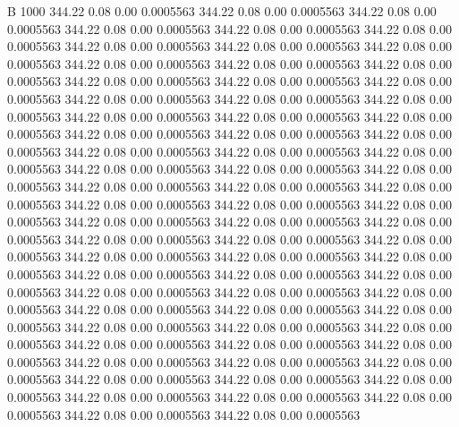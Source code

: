 


B 1000
 344.22    0.08    0.00   0.0005563
 344.22    0.08    0.00   0.0005563
 344.22    0.08    0.00   0.0005563
 344.22    0.08    0.00   0.0005563
 344.22    0.08    0.00   0.0005563
 344.22    0.08    0.00   0.0005563
 344.22    0.08    0.00   0.0005563
 344.22    0.08    0.00   0.0005563
 344.22    0.08    0.00   0.0005563
 344.22    0.08    0.00   0.0005563
 344.22    0.08    0.00   0.0005563
 344.22    0.08    0.00   0.0005563
 344.22    0.08    0.00   0.0005563
 344.22    0.08    0.00   0.0005563
 344.22    0.08    0.00   0.0005563
 344.22    0.08    0.00   0.0005563
 344.22    0.08    0.00   0.0005563
 344.22    0.08    0.00   0.0005563
 344.22    0.08    0.00   0.0005563
 344.22    0.08    0.00   0.0005563
 344.22    0.08    0.00   0.0005563
 344.22    0.08    0.00   0.0005563
 344.22    0.08    0.00   0.0005563
 344.22    0.08    0.00   0.0005563
 344.22    0.08    0.00   0.0005563
 344.22    0.08    0.00   0.0005563
 344.22    0.08    0.00   0.0005563
 344.22    0.08    0.00   0.0005563
 344.22    0.08    0.00   0.0005563
 344.22    0.08    0.00   0.0005563
 344.22    0.08    0.00   0.0005563
 344.22    0.08    0.00   0.0005563
 344.22    0.08    0.00   0.0005563
 344.22    0.08    0.00   0.0005563
 344.22    0.08    0.00   0.0005563
 344.22    0.08    0.00   0.0005563
 344.22    0.08    0.00   0.0005563
 344.22    0.08    0.00   0.0005563
 344.22    0.08    0.00   0.0005563
 344.22    0.08    0.00   0.0005563
 344.22    0.08    0.00   0.0005563
 344.22    0.08    0.00   0.0005563
 344.22    0.08    0.00   0.0005563
 344.22    0.08    0.00   0.0005563
 344.22    0.08    0.00   0.0005563
 344.22    0.08    0.00   0.0005563
 344.22    0.08    0.00   0.0005563
 344.22    0.08    0.00   0.0005563
 344.22    0.08    0.00   0.0005563
 344.22    0.08    0.00   0.0005563
 344.22    0.08    0.00   0.0005563
 344.22    0.08    0.00   0.0005563
 344.22    0.08    0.00   0.0005563
 344.22    0.08    0.00   0.0005563
 344.22    0.08    0.00   0.0005563
 344.22    0.08    0.00   0.0005563
 344.22    0.08    0.00   0.0005563
 344.22    0.08    0.00   0.0005563
 344.22    0.08    0.00   0.0005563
 344.22    0.08    0.00   0.0005563
 344.22    0.08    0.00   0.0005563
 344.22    0.08    0.00   0.0005563
 344.22    0.08    0.00   0.0005563
 344.22    0.08    0.00   0.0005563
 344.22    0.08    0.00   0.0005563
 344.22    0.08    0.00   0.0005563
 344.22    0.08    0.00   0.0005563
 344.22    0.08    0.00   0.0005563
 344.22    0.08    0.00   0.0005563
 344.22    0.08    0.00   0.0005563
 344.22    0.08    0.00   0.0005563
